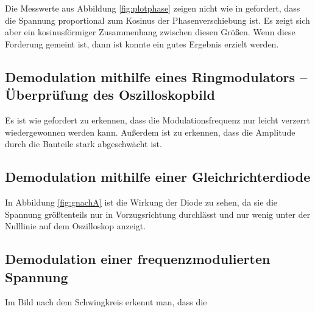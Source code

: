 Die Messwerte aus Abbildung \ref{fig:plotphase} zeigen nicht wie in \cite{anleitung} gefordert, dass die Spannung proportional zum Kosinus der Phasenverschiebung ist. Es zeigt sich aber ein kosinusförmiger Zusammenhang zwischen diesen Größen. Wenn diese Forderung gemeint ist, dann ist konnte ein gutes Ergebnis erzielt werden.


\subsection{Demodulation mithilfe eines Ringmodulators -- Überprüfung des Oszilloskopbild}

Es ist wie gefordert zu erkennen, dass die Modulationsfrequenz nur leicht verzerrt wiedergewonnen werden kann. Außerdem ist zu erkennen, dass die Amplitude durch die Bauteile stark abgeschwächt ist.

\subsection{Demodulation mithilfe einer Gleichrichterdiode}

In Abbildung \ref{fig:gnachA} ist die Wirkung der Diode zu sehen, da sie die Spannung größtenteils nur in Vorzugsrichtung durchlässt und nur wenig unter der Nulllinie auf dem Oszilloskop anzeigt.


\subsection{Demodulation einer frequenzmodulierten Spannung}

Im Bild nach dem Schwingkreis erkennt man, dass die 

